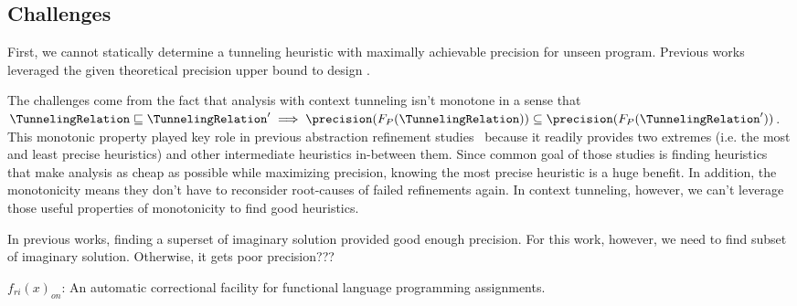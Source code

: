 
\subsection{Challenges}
First, we cannot statically determine a tunneling heuristic with maximally
achievable precision for unseen program. Previous
works~\cite{Oh2015b,Heo2016learning,JeJeChOh17} leveraged the given
theoretical precision upper bound to design .


The challenges come from the fact that analysis
with context tunneling isn't monotone in a sense that $\TunnelingRelation
\sqsubseteq \TunnelingRelation' \implies
\precision(F_P(\TunnelingRelation))  \subseteq
\precision(F_P(\TunnelingRelation'))$. This monotonic property played key
role in previous abstraction refinement
studies~\cite{Oh2015b,Heo2016learning,JeJeChOh17} because it
readily provides two extremes (i.e. the most and least precise heuristics)
and other intermediate heuristics in-between them. Since common goal of
those studies is finding heuristics that make analysis as cheap as possible
while maximizing precision, knowing the most precise heuristic is a huge
benefit. In addition, the monotonicity means they don't have to reconsider
root-causes of failed refinements again. In context tunneling, however, we
can't leverage those useful properties of monotonicity to find good
heuristics.


In previous works, finding a superset of imaginary solution provided good
enough precision. For this work, however, we need to find subset of
imaginary solution. Otherwise, it gets poor precision???

$f_{ri}(x)_{on}$: An automatic correctional facility for functional
language
programming assignments.


